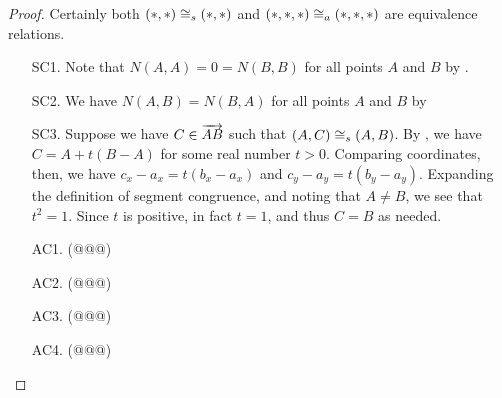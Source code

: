 \begin{proof}
Certainly both \((\ast,\ast) \cong_s (\ast,\ast)\) and \((\ast,\ast,\ast) \cong_a (\ast,\ast,\ast)\) are equivalence relations.
\begin{itemize}
\item[SC1.] Note that \(N(A,A) = 0 = N(B,B)\) for all points \(A\) and \(B\) by .

\item[SC2.] We have \(N(A,B) = N(B,A)\) for all points \(A\) and \(B\) by 

\item[SC3.] Suppose we have \(C \in \overrightarrow{AB}\) such that \((A,C) \cong_s (A,B)\).
By , we have \(C = A + t(B - A)\) for some real number \(t > 0\).
Comparing coordinates, then, we have \(c_x - a_x = t(b_x - a_x)\) and \(c_y - a_y = t(b_y - a_y)\).
Expanding the definition of segment congruence, and noting that \(A \neq B\), we see that \(t^2 = 1\).
Since \(t\) is positive, in fact \(t = 1\), and thus \(C = B\) as needed.

\item[AC1.] (@@@)

\item[AC2.] (@@@)

\item[AC3.] (@@@)

\item[AC4.] (@@@)
\end{itemize}
\end{proof}
